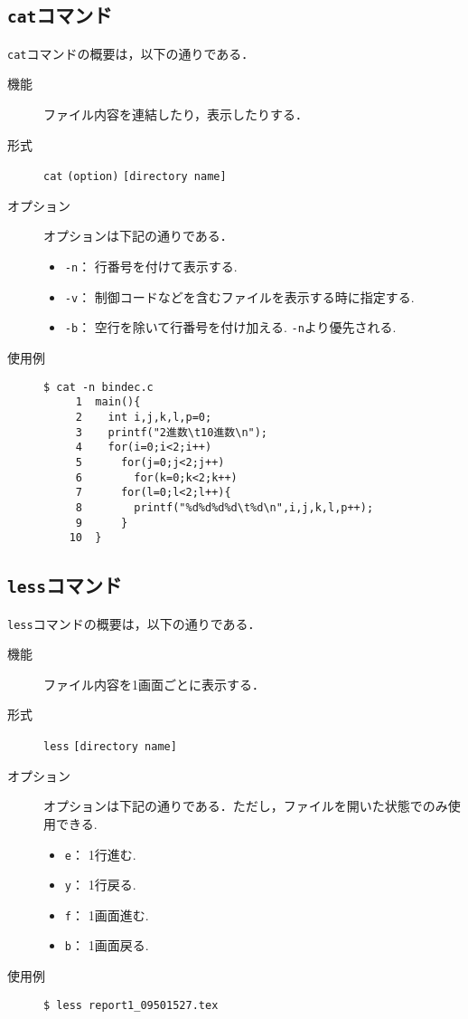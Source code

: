 \documentclass[a4j,11pt]{jarticle}
\begin{document}
\subsection{\texttt{cat}コマンド}
\verb|cat|コマンドの概要は，以下の通りである．
\begin{description}
  \item[機能] %
    ファイル内容を連結したり，表示したりする．
  \item[形式] %
    \verb|cat| \verb|(option)| \verb|[directory name]|
  \item[オプション] %
オプションは下記の通りである．
 \begin{itemize}
      \item \verb|-n|：  行番号を付けて表示する.
      \item \verb|-v|：  制御コードなどを含むファイルを表示する時に指定する.
      \item \verb|-b|：  空行を除いて行番号を付け加える. \verb|-n|より優先される.
    \end{itemize}
  \item[使用例] %
    \begin{verbatim}
$ cat -n bindec.c
     1	main(){
     2	  int i,j,k,l,p=0;
     3	  printf("2進数\t10進数\n");
     4	  for(i=0;i<2;i++)
     5	    for(j=0;j<2;j++)
     6	      for(k=0;k<2;k++)
     7		for(l=0;l<2;l++){
     8		  printf("%d%d%d%d\t%d\n",i,j,k,l,p++);
     9		}
    10	}

    \end{verbatim}
\end{description}

\subsection{\texttt{less}コマンド}
\verb|less|コマンドの概要は，以下の通りである．
\begin{description}
  \item[機能] %
    ファイル内容を1画面ごとに表示する．
  \item[形式] %
    \verb|less| \verb|[directory name]|
  \item[オプション] %
オプションは下記の通りである．ただし，ファイルを開いた状態でのみ使用できる.
 \begin{itemize}
      \item \verb|e|：  1行進む.
      \item \verb|y|：  1行戻る.
      \item \verb|f|：  1画面進む. 
      \item \verb|b|：  1画面戻る.
    \end{itemize}
  \item[使用例] %
    \begin{verbatim}
$ less report1_09501527.tex
    \end{verbatim}
\end{description}
\end{document}
